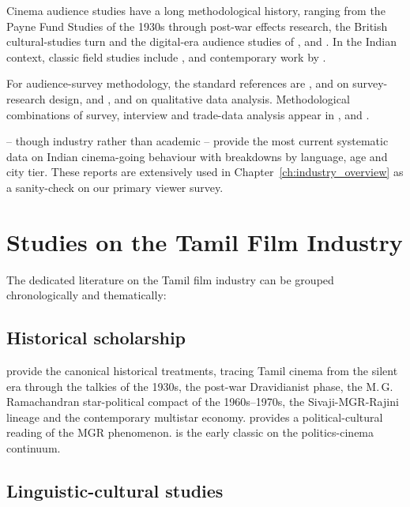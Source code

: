 Cinema audience studies have a long methodological history, ranging
from the Payne Fund Studies of the 1930s \citep{jowett1996} through
post-war effects research, the British cultural-studies turn
\citep{stacey1994,kuhn2002} and the digital-era audience studies of
\citet{barker2008}, \citet{tryon2013} and \citet{ross2008}.  In the
Indian context, classic field studies include
\citet{dickey1993,prasad1998,vasudevan2010,mazumdar2007}, and
contemporary work by \citet{ganti2012,nakassis2017,gopalan2002,
mukherjee2020}.

For audience-survey methodology, the standard references are
\citet{babbie2020}, \citet{groves2009} and \citet{tourangeau2000} on
survey-research design, and \citet{taylorbogdan2015}, \citet{
strauss1998} and \citet{saldana2021} on qualitative data analysis.
Methodological combinations of survey, interview and trade-data
analysis appear in \citet{redvall2013}, \citet{noh2020} and
\citet{singh2022ottstructure}.

\citet{ormax2022,ormax2023,ormax2024} -- though industry rather than
academic -- provide the most current systematic data on Indian
cinema-going behaviour with breakdowns by language, age and city
tier.  These reports are extensively used in
Chapter~\ref{ch:industry_overview} as a sanity-check on our primary
viewer survey.

\section{Studies on the Tamil Film Industry}
\label{sec:tamilcinema}

The dedicated literature on the Tamil film industry can be grouped
chronologically and thematically:

\subsection{Historical scholarship}

\citet{baskaran1996,baskaran2009} provide the canonical historical
treatments, tracing Tamil cinema from the silent era through the
talkies of the 1930s, the post-war Dravidianist phase, the
M.\,G.\,Ramachandran star-political compact of the 1960s--1970s, the
Sivaji-MGR-Rajini lineage and the contemporary multistar economy.
\citet{pandian1992} provides a political-cultural reading of the MGR
phenomenon.  \citet{hardgrave1973} is the early classic on the
politics-cinema continuum.

\subsection{Linguistic-cultural studies}

